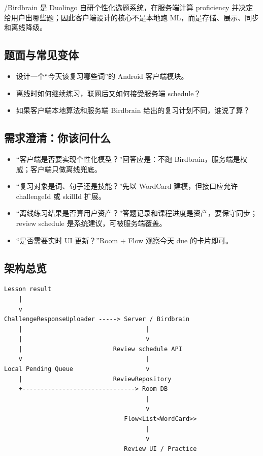 
\srcofficial/\srccommunity Birdbrain 是 Duolingo 自研个性化选题系统，在服务端计算 proficiency 并决定给用户出哪些题；\srcinferred 因此客户端设计的核心不是本地跑 ML，而是存储、展示、同步和离线降级。

\subsection{题面与常见变体}

\begin{itemize}
  \item 设计一个“今天该复习哪些词”的 Android 客户端模块。
  \item 离线时如何继续练习，联网后又如何接受服务端 schedule？
  \item 如果客户端本地算法和服务端 Birdbrain 给出的复习计划不同，谁说了算？
\end{itemize}

\subsection{需求澄清：你该问什么}

\begin{itemize}
  \item “客户端是否要实现个性化模型？”回答应是：不跑 Birdbrain，服务端是权威；客户端只做离线兜底。
  \item “复习对象是词、句子还是技能？”先以 WordCard 建模，但接口应允许 challengeId 或 skillId 扩展。
  \item “离线练习结果是否算用户资产？”答题记录和课程进度是资产，要保守同步；review schedule 是系统建议，可被服务端覆盖。
  \item “是否需要实时 UI 更新？”Room + Flow 观察今天 due 的卡片即可。
\end{itemize}

\subsection{架构总览}

\begin{lstlisting}
Lesson result
    |
    v
ChallengeResponseUploader -----> Server / Birdbrain
    |                                  |
    |                                  v
    |                         Review schedule API
    v                                  |
Local Pending Queue                    v
    |                         ReviewRepository
    +-------------------------------> Room DB
                                       |
                                       v
                                 Flow<List<WordCard>>
                                       |
                                       v
                                 Review UI / Practice
\end{lstlisting}

